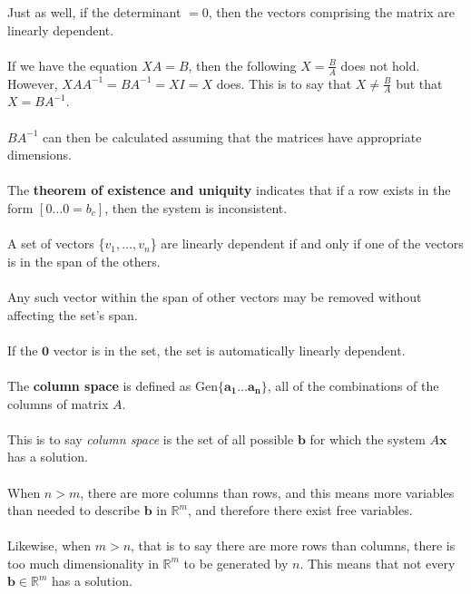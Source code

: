 \documentclass[12pt]{article}
\newcommand{\gen}[1]{\mathrm{Gen}\{{#1}\}}
\newcommand{\R}{\mathbb{R}}
\newcommand{\bt}[1]{\textbf{{#1}}}
\newcommand{\bm}[1]{\mathbf{{#1}}}
\begin{document}
Just as well, if the determinant $= 0$, then the vectors comprising the matrix are linearly dependent. \\ \\

If we have the equation $XA = B$, then the following $X = \frac{B}{A}$ does not hold. However, $XAA^{-1} = BA^{-1} = XI = X$ does. This is to say that $X \neq \frac{B}{A}$ but that $X = BA^{-1}$. \\ \\

$BA^{-1}$ can then be calculated assuming that the matrices have appropriate dimensions. \\ \\

The \textbf{theorem of existence and uniquity} indicates that if a row exists in the form
$[0\dots 0 = b_c]$, then the system is inconsistent. \\ \\

A set of vectors \{$v_1, \dots, v_n$\} are linearly dependent if and only if one of the vectors is in the span of the others. \\ \\

Any such vector within the span of other vectors may be removed without affecting the set's span. \\ \\

If the $\bt{0}$ vector is in the set, the set is automatically linearly dependent. \\ \\

The \textbf{column space} is defined as $\gen{\bm{a_1}\dots \bm{a_n}}$, all of the combinations of the columns of matrix $A$. \\ \\

This is to say \emph{column space} is the set of all possible $\bm{b}$ for which the system $A\bt{x}$ has a solution. \\ \\

When $n > m$, there are more columns than rows, and this means more variables than needed to describe $\bm{b}$ in $\R^m$, and therefore there exist free variables. \\ \\

Likewise, when $m > n$, that is to say there are more rows than columns, there is too much dimensionality in $\R^m$ to be generated by $n$. This means that not every $\bm{b} \in \R^m$ has a solution. \\ \\
\end{document}
